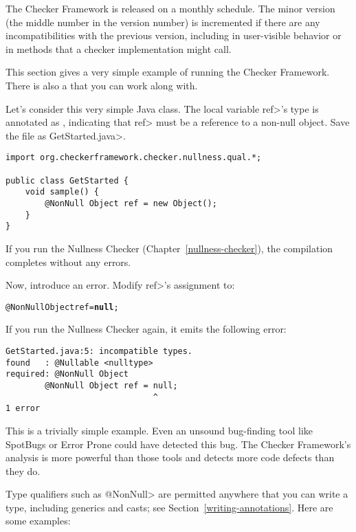 \label{version-number}
The Checker Framework is released on a monthly schedule.  The minor version
(the middle number in the version number) is incremented if there are any
incompatibilities
with the previous version, including in user-visible
behavior or in methods that a checker implementation might call.



This section gives a very simple example of running the Checker Framework.
There is also a 
that you can work along with.

  Let's consider this very simple Java class.  The local variable \<ref>'s type is
  annotated as , indicating that \<ref> must be a reference to a
  non-null object.  Save the file as \<GetStarted.java>.

\begin{Verbatim}
import org.checkerframework.checker.nullness.qual.*;

public class GetStarted {
    void sample() {
        @NonNull Object ref = new Object();
    }
}
\end{Verbatim}

If you run the Nullness Checker (Chapter~\ref{nullness-checker}), the
compilation completes without any errors.

Now, introduce an error.  Modify \<ref>'s assignment to:
\begin{alltt}
  @NonNull Object ref = \textbf{null};
\end{alltt}

If you run the Nullness Checker again, it emits
  the following error:
\begin{Verbatim}
GetStarted.java:5: incompatible types.
found   : @Nullable <nulltype>
required: @NonNull Object
        @NonNull Object ref = null;
                              ^
1 error
\end{Verbatim}

This is a trivially simple example.  Even an unsound bug-finding tool like
SpotBugs or Error Prone could have detected this bug.  The
Checker Framework's analysis is more powerful than those tools and detects
more code defects than they do.

Type qualifiers such as \<@NonNull> are permitted anywhere
that you can write a type, including generics and casts; see
Section~\ref{writing-annotations}.  Here are some examples:

